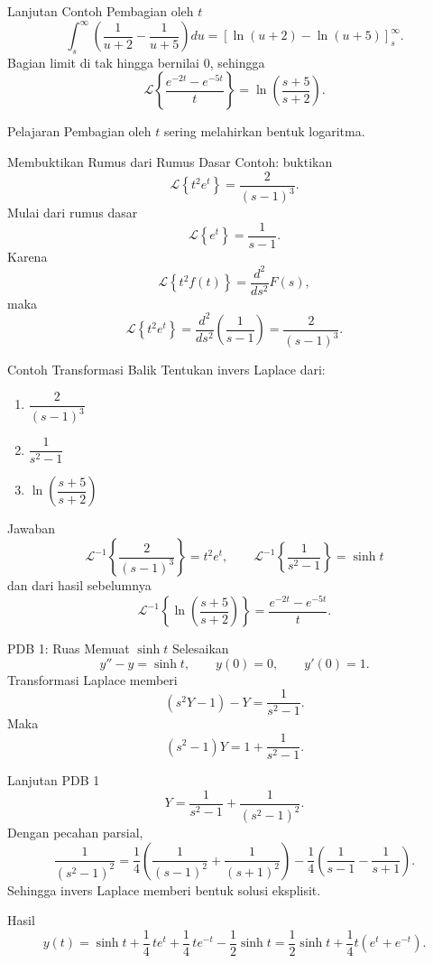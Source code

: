 \documentclass[aspectratio=169,10pt]{beamer}
\newcommand{\Lcal}{\mathcal{L}}
\newcommand{\Lap}[1]{\Lcal\left\{#1\right\}}
\newcommand{\invLap}[1]{\Lcal^{-1}\left\{#1\right\}}
\begin{document}
\begin{frame}{Lanjutan Contoh Pembagian oleh $t$}
\[
\int_s^{\infty}\left(\frac{1}{u+2}-\frac{1}{u+5}\right)du
=
\left[\ln(u+2)-\ln(u+5)\right]_s^{\infty}.
\]
Bagian limit di tak hingga bernilai $0$, sehingga
\[
\Lap{\frac{e^{-2t}-e^{-5t}}{t}}=
\ln\left(\frac{s+5}{s+2}\right).
\]
\begin{exampleblock}{Pelajaran}
Pembagian oleh $t$ sering melahirkan bentuk logaritma.
\end{exampleblock}
\end{frame}

\begin{frame}{Membuktikan Rumus dari Rumus Dasar}
Contoh: buktikan
\[
\Lap{t^2 e^t}=\frac{2}{(s-1)^3}.
\]
Mulai dari rumus dasar
\[
\Lap{e^t}=\frac{1}{s-1}.
\]
Karena
\[
\Lap{t^2 f(t)}=\frac{d^2}{ds^2}F(s),
\]
maka
\[
\Lap{t^2 e^t}=\frac{d^2}{ds^2}\left(\frac{1}{s-1}\right)=\frac{2}{(s-1)^3}.
\]
\end{frame}

\begin{frame}{Contoh Transformasi Balik}
Tentukan invers Laplace dari:
\begin{enumerate}
\item $\dfrac{2}{(s-1)^3}$
\item $\dfrac{1}{s^2-1}$
\item $\ln\left(\dfrac{s+5}{s+2}\right)$
\end{enumerate}
\vspace{1mm}
\begin{exampleblock}{Jawaban}
\[
\invLap{\frac{2}{(s-1)^3}}=t^2 e^t,
\qquad
\invLap{\frac{1}{s^2-1}}=\sinh t
\]
dan dari hasil sebelumnya
\[
\invLap{\ln\left(\frac{s+5}{s+2}\right)}=\frac{e^{-2t}-e^{-5t}}{t}.
\]
\end{exampleblock}
\end{frame}

\begin{frame}{PDB 1: Ruas Memuat $\sinh t$}
Selesaikan
\[
y''-y=\sinh t,
\qquad y(0)=0,
\qquad y'(0)=1.
\]
Transformasi Laplace memberi
\[
(s^2Y-1)-Y=\frac{1}{s^2-1}.
\]
Maka
\[
(s^2-1)Y=1+\frac{1}{s^2-1}.
\]
\end{frame}

\begin{frame}{Lanjutan PDB 1}
\[
Y=\frac{1}{s^2-1}+\frac{1}{(s^2-1)^2}.
\]
Dengan pecahan parsial,
\[
\frac{1}{(s^2-1)^2}
=\frac{1}{4}\left(\frac{1}{(s-1)^2}+\frac{1}{(s+1)^2}\right)-\frac{1}{4}\left(\frac{1}{s-1}-\frac{1}{s+1}\right).
\]
Sehingga invers Laplace memberi bentuk solusi eksplisit.\vspace{1mm}

\begin{exampleblock}{Hasil}
\[
y(t)=\sinh t+\frac14\,t e^t+\frac14\,t e^{-t}-\frac12\sinh t
=\frac12\sinh t+\frac14 t(e^t+e^{-t}).
\]
\end{exampleblock}
\end{frame}
\end{document}
